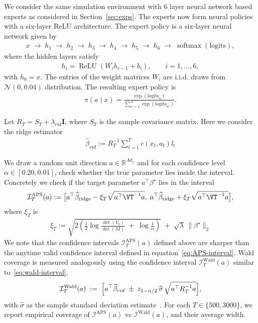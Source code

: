 \documentclass[11pt,letterpaper]{article}
\newcommand{\Id}{\mathbf{I}}
\theoremstyle{plain}
\theoremstyle{definition}  %
\begin{document}
We consider the same simulation environment with $6$ layer neural network based experts as considered in Section~\ref{sec:exps}.  The experts now form neural policies with a six-layer ReLU architecture. The expert policy is a six-layer neural network given by
\begin{align*}
   x \;\longrightarrow\; h_1 \;\longrightarrow\; h_2 \;\longrightarrow\; h_3
\;\longrightarrow\; h_4 \;\longrightarrow\; h_5 \;\longrightarrow\; h_6
\;\longrightarrow\; \operatorname{softmax}(\text{logits}), 
\end{align*}
%
where the hidden layers satisfy
\begin{align*}
   h_i = \operatorname{ReLU}\!\left( W_i h_{i-1} + b_i \right),
\qquad i = 1,\ldots,6, 
\end{align*}
%
with \(h_0 = x\). The entries of the weight matrices $W_i$ are i.i.d. draws from $\mathcal{N}(0,0.04)$ distribution. 
The resulting expert policy is
\begin{align*}
    \pi(a \mid x) = \frac{\exp(\text{logits}_a)}{\sum_{a'=1}^A \exp(\text{logits}_{a'})}.
\end{align*}

\noindent Let $R_T = S_T + \lambda_{rid} \Id$, where $S_T$ is the sample covariance matrix. Here we consider the ridge estimator
\begin{align*}
  \widehat{\beta}_{rid} := R_T^{-1} \sum^T_{t=1}c(x_t,a_t)l_t  
\end{align*}



\noindent We draw a random unit direction $a\in\mathbb{R}^{A d_x}$ and for each confidence level $\alpha \in [0.20, 0.01]$, check whether the true parameter lies inside the interval. Concretely we check if the target parameter $a^\top\beta^\star$ lies in the interval 
\begin{align*}
\mathcal{I}^{\mathrm{APS}}_T(a) :=  \big[a^\top\widehat\beta_{\mathrm{ridge}}-\xi_T\sqrt{a^\top \VT^{-1}a},\;
a^\top\widehat\beta_{\mathrm{ridge}}+\xi_T\sqrt{a^\top \VT^{-1}a}\big],
\end{align*}
where $\xi_T$ is
\begin{align}
    \xi_T :=  \sqrt{
2\!\left(
\frac{1}{2}\log\frac{\det(V_t)}{\det(\lambda I)}
\;+\;
\log\frac{1}{\alpha}
\right)
}
\;+\;
\sqrt{\lambda}\,\|\beta^\star\|_2
\end{align}
We note that the confidence intervals $\mathcal{I}^{\mathrm{APS}}_T(a)$ defined above are sharper than the anytime valid confidence interval defined in equation~\eqref{eq:APS-interval}. Wald coverage is measured analogously using the confidence
 interval $ \mathcal{I}^{\mathrm{Wald}}_T(a)$ similar to~\eqref{eq:wald-interval},
 \begin{align} 
    \mathcal{I}^{\mathrm{Wald}}_T(a)
    \;:=\;
    \Bigl[
        a^\top \widehat{\beta}_{rid}
        \;\pm\;
        z_{1-\alpha/2}\,
        \widehat\sigma\, \sqrt{a^\top R_T^{-1} a}
    \Bigr],
\end{align} with $\widehat{\sigma}$ as the sample standard deviation estimate~\cite[Lemma 3]{lai1982least}. For each $T \in \{500, 3000 \}$, we report empirical coverage of $\mathcal{I}^{\mathrm{APS}}(a)$ vs $\mathcal{I}^{\mathrm{Wald}}(a)$, and their average width.
\end{document}

